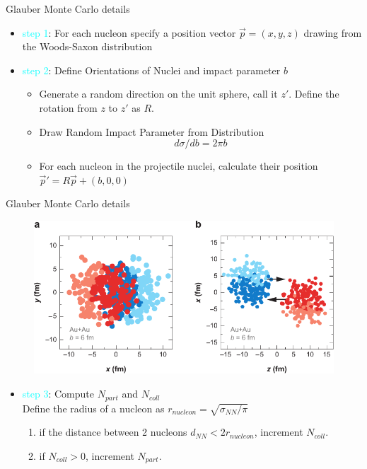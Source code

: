 \documentclass{beamer}
\begin{document}
\begin{frame}{Glauber Monte Carlo details}
  \begin{itemize}
    \item \textcolor{cyan}{step 1}: For each nucleon specify a position vector $\vec{p}=(x,y,z)$ drawing from the Woods-Saxon distribution
    \item \textcolor{cyan}{step 2}: Define Orientations of Nuclei and impact parameter $b$
    \begin{itemize}
      \item Generate a random direction on the unit sphere, call it $z'$. Define the rotation from $z$ to $z'$ as $R$.
      \item Draw Random Impact Parameter from Distribution
      \begin{equation}
        d\sigma /db=2\pi b
      \end{equation}
      \item For each nucleon in the projectile nuclei, calculate their position $\vec{p}'=R\vec{p}+(b,0,0)$
    \end{itemize}
  \end{itemize}
\end{frame}


\begin{frame}{Glauber Monte Carlo details}
  \begin{figure}
    \includegraphics[width=.7\textwidth]{plots/GMC_event.pdf}
  \end{figure}
  \begin{itemize}
    \item \textcolor{cyan}{step 3}: Compute $N_{part}$ and $N_{coll}$ \\
			Define the radius of a nucleon as $r_{nucleon}=\sqrt{\sigma_{NN}/\pi}$
			\begin{enumerate}
			\item if the distance between 2 nucleons $d_{NN}<2r_{nucleon}$, increment $N_{coll}$.
			\item if $N_{coll}>0$, increment $N_{part}$.
			\end{enumerate}
  \end{itemize}
\end{frame}
\end{document}
